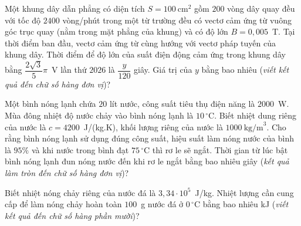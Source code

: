 	\begin{ex}%
		Một khung dây dẫn phẳng có diện tích $S=100~\text{cm}^2$ gồm $200$ vòng dây quay đều với tốc độ $2400$ vòng/phút trong một từ trường đều có vectơ cảm ứng từ vuông góc trục quay (nằm trong mặt phẳng của khung) và có độ lớn $B=0{,}005$~T. Tại thời điểm ban đầu, vectơ cảm ứng từ cùng hướng với vectơ pháp tuyến của khung dây. Thời điểm để độ lớn của suất điện động cảm ứng trong khung dây bằng $\dfrac{2\sqrt{3}}{5}\pi$~V lần thứ $2026$ là $\dfrac{y}{120}$ giây. Giá trị của $y$ bằng bao nhiêu (\textit{viết kết quả đến chữ số hàng đơn vị})?
		\par
	\end{ex}

	\begin{ex}%
		Một bình nóng lạnh chứa $20$ lít nước, công suất tiêu thụ điện năng là $2000$~W. Mùa đông nhiệt độ nước chảy vào bình nóng lạnh là $10\,^\circ\text{C}$. Biết nhiệt dung riêng của nước là $c=4200$~J/(kg.K), khối lượng riêng của nước là $1000~\text{kg/m}^3$. Cho rằng bình nóng lạnh sử dụng đúng công suất, hiệu suất làm nóng nước của bình là $95\%$ và khi nước trong bình đạt $75\,^\circ\text{C}$ thì rơ le sẽ ngắt. Thời gian từ lúc bật bình nóng lạnh đun nóng nước đến khi rơ le ngắt bằng bao nhiêu giây (\textit{kết quả làm tròn đến chữ số hàng đơn vị})?
		\par
	\end{ex}

	\begin{ex}%
		Biết nhiệt nóng chảy riêng của nước đá là $3{,}34\cdot 10^5$~J/kg. Nhiệt lượng cần cung cấp để làm nóng chảy hoàn toàn $100$~g nước đá ở $0\,^\circ\text{C}$ bằng bao nhiêu kJ (\textit{viết kết quả đến chữ số hàng phần mười})?
		\par
	\end{ex}

